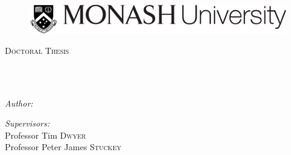 \documentclass[
11pt, %
english, %
singlespacing, %
headsepline, %
]{MastersDoctoralThesis} %
\author{Shuai \textsc{Fu}} %
\begin{document}
\frontmatter %

\pagestyle{plain} %


\begin{titlepage}
\begin{center}

\vspace*{.06\textheight}
\begin{figure}
    \centering
	\includegraphics[width=0.75\linewidth]{Figures/Monash}
\end{figure}
\textsc{\Large Doctoral Thesis}\\[0.5cm] %

\HRule \\[0.4cm] %
{\LARGE \bfseries \ttitle\par}\vspace{0.4cm} %
\HRule \\[1.5cm] %
 
\begin{minipage}[t]{0.3\textwidth}
\begin{flushleft} \large
\emph{Author:}\\
\authorname %
\end{flushleft}
\end{minipage}
\begin{minipage}[t]{0.6\textwidth}
\begin{flushright} \large
\emph{Supervisors:} \\
Professor Tim \textsc{Dwyer} \\
Professor Peter James \textsc{Stuckey} 

\end{flushright}
\end{minipage}\\[3cm]
 

\end{center}
\end{titlepage}
\end{document}
